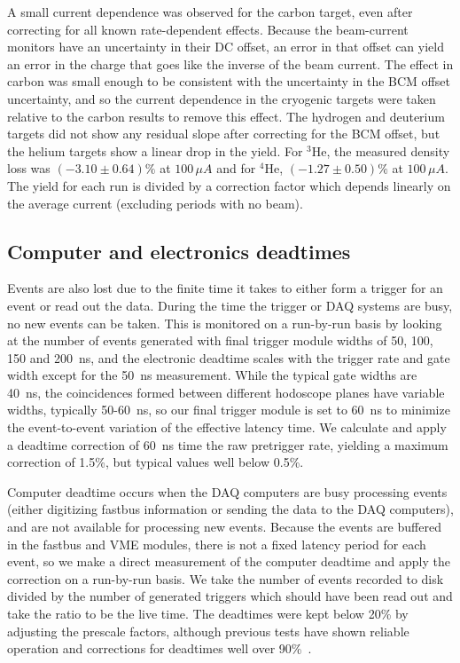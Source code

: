 A small current dependence was observed for the carbon target, even after
correcting for all known rate-dependent effects. Because the beam-current
monitors have an uncertainty in their DC offset, an error in that offset can
yield an error in the charge that goes like the inverse of the beam current.
The effect in carbon was small enough to be consistent with the uncertainty
in the BCM offset uncertainty, and so the current dependence in the cryogenic
targets were taken relative to the carbon results to remove this effect. The
hydrogen and deuterium targets did not show any residual slope after
correcting for the BCM offset, but the helium targets show a linear drop in
the yield. For $^{3}$He, the measured density loss was $(-3.10 \pm 0.64)\% $ at
$100\,\mu A$ and for $^{4}$He, $(-1.27 \pm 0.50)\% $ at $100\,\mu A$. The
yield for each run is divided by a correction factor which depends linearly on
the average current (excluding periods with no beam).

\subsection{Computer and electronics deadtimes}

Events are also lost due to the finite time it takes to either form a trigger
for an event or read out the data. During the time the trigger or
DAQ systems are busy, no new events can be taken. This is monitored on a
run-by-run basis by looking at the number of events generated with final
trigger module widths of 50, 100, 150 and 200~ns, and the electronic deadtime
scales with the trigger rate and gate width except for the 50~ns measurement.
While the typical gate widths are 40~ns, the coincidences formed between
different hodoscope planes have variable widths, typically 50-60~ns, so our
final trigger module is set to 60~ns to minimize the event-to-event variation
of the effective latency time. We calculate and apply a deadtime correction of
60~ns time the raw pretrigger rate, yielding a maximum correction of 1.5\%,
but typical values well below 0.5\%.


Computer deadtime occurs when the DAQ computers are busy processing events
(either digitizing fastbus information or sending the data to the DAQ
computers), and are not available for processing new events. Because the
events are buffered in the fastbus and VME modules, there is not a fixed
latency period for each event, so we make a direct measurement of the
computer deadtime and apply the correction on a run-by-run basis. We take
the number of events recorded to disk divided by the number of generated
triggers which should have been read out and take the ratio to be the live
time. The deadtimes were kept below 20\% by adjusting the prescale factors,
although previous tests have shown reliable operation and corrections for
deadtimes well over 90\%~\cite{johna_thesis}.


